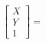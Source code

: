 \documentclass[preview]{standalone}
\begin{document}
\begin{align*}
\begin{bmatrix} X \\ Y \\ 1 \end{bmatrix} =
\end{align*}
\end{document}
